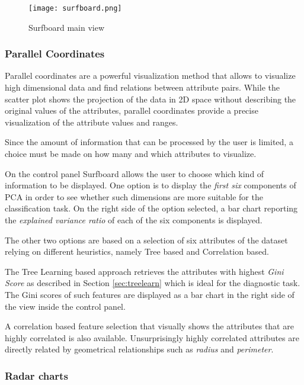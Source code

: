\documentclass{article}
\begin{document}
\begin{figure}
\centering
\texttt{[image: surfboard.png]} \\
\caption{Surfboard main view}
\label{fig:surfboard}
\end{figure}

\subsubsection*{Parallel Coordinates}

Parallel coordinates are a powerful visualization method that allows to
visualize high dimensional data and find relations between attribute pairs.
While the scatter plot shows the projection of the data in 2D space without
describing the original values of the attributes, parallel coordinates provide a
precise visualization of the attribute values and ranges.

Since the amount of information that can be processed by the user is limited, a
choice must be made on how many and which attributes to visualize.

On the control panel Surfboard allows the user to choose which kind of
information to be displayed. One option is to display the \emph{first six}
components of PCA in order to see whether such dimensions are more suitable for
the classification task. On the right side of the option selected, a bar chart
reporting the \emph{explained variance ratio} of each of the six components is
displayed.

The other two options are based on a selection of six attributes of the
dataset relying on different heuristics, namely Tree based and
Correlation based.

The Tree Learning based
approach retrieves the attributes with highest \emph{Gini Score} as
described in Section \ref{sec:treelearn} which is ideal for the diagnostic
task. The Gini scores of such features are displayed as a bar chart in
the right side of the view inside the control panel.

A correlation based feature selection that visually shows the attributes that
are highly correlated is also available. Unsurprisingly highly correlated
attributes are directly related by geometrical relationships such as
\emph{radius} and \emph{perimeter}.


\subsubsection*{Radar charts}
\end{document}
